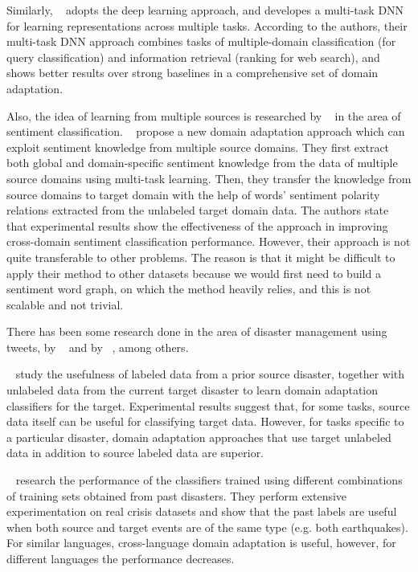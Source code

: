 Similarly, ~\citet{multitaskdeep} adopts the deep learning approach, and developes a multi-task DNN for learning representations across multiple tasks. According to the authors, their multi-task DNN approach combines tasks of multiple-domain classification (for query classification) and information retrieval (ranking for web search), and 
shows better results over strong baselines in a comprehensive set of domain adaptation.

Also, the idea of learning from multiple sources is researched by ~\citet{sentmulti} in the area of sentiment classification. ~\citet{sentmulti} propose a new domain adaptation approach which can exploit sentiment knowledge from multiple source domains. They first extract both global and domain-specific sentiment knowledge from the data of multiple source domains using multi-task learning. Then, they transfer the knowledge from source domains to target domain with the help of words’ sentiment polarity relations extracted from the unlabeled target domain data. The authors state that experimental results show the effectiveness of the approach in improving cross-domain sentiment classification performance. However, their approach is not quite transferable to other problems. The reason is that it might be difficult to apply their method to other datasets because we would first need to build a sentiment word graph, on which the method heavily relies, and this is not scalable and not trivial. 

There has been some research done in the area of disaster management using tweets, by ~\citet{twitterda} and by ~\citet{imran16}, among others. 

~\citet{twitterda} study the usefulness of labeled data from a prior source disaster, together with unlabeled data from the current target disaster to learn domain adaptation classifiers for the target. Experimental results suggest that, for some tasks, source data itself can be useful for classifying target data. However, for tasks specific to a particular disaster, domain adaptation approaches that use target unlabeled data in addition to source labeled data are superior.

~\citet{imran16} research the performance of the classifiers trained using different combinations of training sets obtained from past disasters. They perform extensive experimentation on real crisis datasets and show that the past 
labels are useful when both source and target events are of the same type (e.g. both earthquakes). For similar languages, cross-language domain adaptation is useful, however, for different languages the performance decreases.

